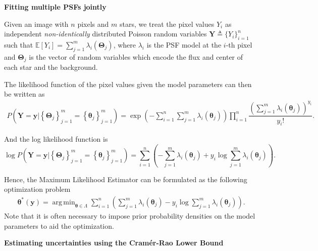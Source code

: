 \documentclass[landscape,a0b,final]{a0poster}
\DeclareMathOperator*{\argmin}{arg\,min}
\newenvironment{poster}{
  \begin{center}
  \begin{minipage}[c]{0.98\textwidth}
}{
  \end{minipage}
  \end{center}
}
\newenvironment{pcolumn}[1]{
  \begin{minipage}{#1\textwidth}
  \begin{center}
}{
  \end{center}
  \end{minipage}
}
\begin{document}
\begin{poster}
\begin{center}
\begin{pcolumn}{0.32}
{    \begin{center}
        \textbf{Fitting multiple PSFs jointly}
    \end{center}

    Given an image with $n$ pixels and $m$ stars, we treat the pixel values $Y_i$ as
    independent \emph{non-identically} distributed Poisson random variables $\bm{Y} \triangleq \{Y_i\}_{i=1}^{n}$
    such that $\mathbb{E}\left[Y_i\right] = \sum_{j=1}^{m}\lambda_i(\bm{\Theta}_j)$,
    where $\lambda_i$ is the PSF model at the $i$-th pixel and $\bm{\Theta}_j$ is the
    vector of random variables which encode the flux and center of each star and the background.

    The likelihood function of the pixel values given the model parameters can then be written as
\begin{align}
   P\left(\bm{Y} = \bm{y} \Bigr| \left\{\bm{\Theta}_j\right\}_{j=1}^{m} = \left\{\bm{\theta}_j\right\}_{j=1}^{m}\right) = \exp\left({-\sum_{i=1}^{n}\sum_{j=1}^{m}\lambda_i(\bm{\theta}_j)}\right)\prod_{i=1}^{n}\dfrac{\left(\sum_{j=1}^{m}\lambda_i\left(\bm{\theta}_j\right)\right)^{y_i}}{y_i!}.
\end{align}

And the log likelihood function is
\begin{equation}
    \log  P\left(\bm{Y} = \bm{y} \Bigr| \left\{\bm{\Theta}_j\right\}_{j=1}^{m} = \left\{\bm{\theta}_j\right\}_{j=1}^{m}\right) = \sum_{i=1}^{n}\left(- \sum_{j=1}^{m}\lambda_i(\bm{\theta}_j) + y_i\log\sum_{j=1}^{m}\lambda_i(\bm{\theta}_j)\right).
\end{equation}

    Hence, the Maximum Likelihood Estimator can be formulated as the following optimization problem
\begin{align}
    \bm{\theta}^{*}(\bm{y}) = \argmin_{\bm{\theta} \in \Lambda} \sum_{i=1}^{n}\left(\sum_{j=1}^{m}\lambda_i(\bm{\theta}_j) - y_i\log\sum_{j=1}^{m}\lambda_i(\bm{\theta}_j)\right).
\end{align}
Note that it is often necessary to impose prior probability densities on the model parameters
    to aid the optimization.

\vspace{0.75cm}
    \begin{center}
        \textbf{Estimating uncertainties using the Cram\'er-Rao Lower Bound}
    \end{center}

}
\end{pcolumn}
\end{center}
\end{poster}
\end{document}
